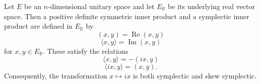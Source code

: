 Let $E$ be an $n$-dimensional unitary space and let $E_{\mathbb{R}}$ be its underlying real vector space. Then a positive definite symmetric inner product and a symplectic inner product are defined in $E_{\mathbb{R}}$ by
$$(x, y) = \operatorname{Re}(x, y)$$
$$\langle x, y \rangle = \operatorname{Im}(x, y)$$
for $x, y \in E_{\mathbb{R}}$. These satisfy the relations
$$\langle x, y \rangle = -(ix, y)$$
$$\langle ix, y \rangle = (x, y).$$
Consequently, the transformation $x \mapsto ix$ is both symplectic and skew symplectic.
